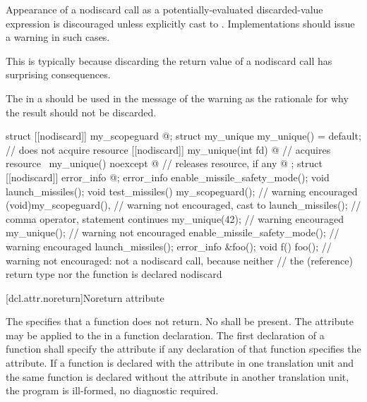 \pnum
\recommended
Appearance of a nodiscard call as
a potentially-evaluated discarded-value expression
is discouraged unless explicitly cast to .
Implementations should issue a warning in such cases.
\begin{note}
This is typically because discarding the return value
of a nodiscard call has surprising consequences.
\end{note}
The 
in a  
should be used in the message of the warning
as the rationale for why the result should not be discarded.

\pnum
\begin{example}
\begin{codeblock}
struct [[nodiscard]] my_scopeguard { @\commentellip@ };
struct my_unique {
  my_unique() = default;                                // does not acquire resource
  [[nodiscard]] my_unique(int fd) { @\commentellip@ }         // acquires resource
  ~my_unique() noexcept { @\commentellip@ }                   // releases resource, if any
  @\commentellip@
};
struct [[nodiscard]] error_info { @\commentellip@ };
error_info enable_missile_safety_mode();
void launch_missiles();
void test_missiles() {
  my_scopeguard();              // warning encouraged
  (void)my_scopeguard(),        // warning not encouraged, cast to 
    launch_missiles();          // comma operator, statement continues
  my_unique(42);                // warning encouraged
  my_unique();                  // warning not encouraged
  enable_missile_safety_mode(); // warning encouraged
  launch_missiles();
}
error_info &foo();
void f() { foo(); }             // warning not encouraged: not a nodiscard call, because neither
                                // the (reference) return type nor the function is declared nodiscard
\end{codeblock}
\end{example}

[dcl.attr.noreturn]{Noreturn attribute}%

\pnum
The   specifies that a function does not return.
No
 shall be present. The attribute may be applied to the
 in a function declaration. The first declaration of a function shall
specify the  attribute if any declaration of that function specifies the
 attribute. If a function is declared with the  attribute in one
translation unit and the same function is declared without the  attribute in another
translation unit, the program is ill-formed, no diagnostic required.

